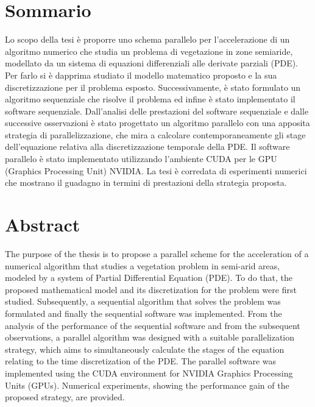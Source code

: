 \thispagestyle{headings}
\section*{Sommario}
\noindent Lo scopo della tesi è proporre uno schema parallelo per l'accelerazione di un algoritmo numerico che studia un problema di vegetazione in zone semiaride, modellato da un sistema di equazioni differenziali alle derivate parziali (PDE). Per farlo si è dapprima studiato il modello matematico proposto e la sua discretizzazione per il problema esposto. Successivamente, è stato formulato un algoritmo sequenziale che risolve il problema ed infine è stato implementato il software sequenziale. Dall'analisi delle prestazioni del software sequenziale e dalle successive osservazioni è stato progettato un algoritmo parallelo con una apposita strategia di parallelizzazione, che mira a calcolare contemporaneamente gli stage dell'equazione relativa alla discretizzazione temporale della PDE. Il software parallelo è stato implementato utilizzando l'ambiente CUDA per le GPU (Graphics Processing Unit) NVIDIA. La tesi è corredata di esperimenti numerici che mostrano il guadagno in termini di prestazioni della strategia proposta.

\section*{Abstract}
\noindent The purpose of the thesis is to propose a parallel scheme for the acceleration of a numerical algorithm that studies a vegetation problem in semi-arid areas, modeled by a system of Partial Differential Equation (PDE). To do that, the proposed mathematical model and its discretization for the problem  were first studied. Subsequently, a sequential algorithm that solves the problem was formulated and finally the sequential software was implemented. From the analysis of the performance of the sequential software and from the subsequent observations, a parallel algorithm was designed with a suitable parallelization strategy, which aims to simultaneously calculate the stages of the equation relating to the time discretization of the PDE. The parallel software was implemented using the CUDA environment for NVIDIA Graphics Processing Units (GPUs). Numerical experiments, showing the performance gain of the proposed strategy, are provided.
